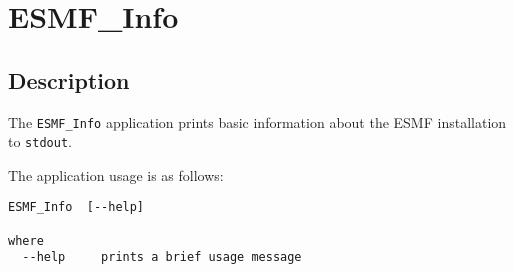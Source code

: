 
\section{ESMF\_Info}
\label{sec:ESMF_Info}

\subsection{Description}

The {\tt ESMF\_Info} application prints basic information about the ESMF 
installation to {\tt stdout}.

The application usage is as follows:

\begin{verbatim}
ESMF_Info  [--help]

where
  --help     prints a brief usage message
  
\end{verbatim}
